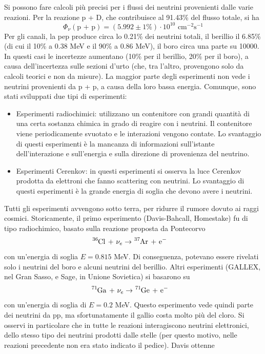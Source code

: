 \documentclass[a4paper,11pt]{article}
\theoremstyle{theorem}
\theoremstyle{definition}
\begin{document}
\begin{itemize}
		\noindent Si possono fare calcoli più precisi per i flussi dei neutrini provenienti dalle varie reazioni. Per la reazione p + D, che contribuisce al 91.43\% del flusso totale, si ha
		\[\Phi_\nu(\textrm{p + p})=(5.992\pm 1\%)\cdot10^{10}\textrm{ cm}^{-2}\textrm{s}^{-1}\]
		Per gli canali, la pep produce circa lo 0.21\% dei neutrini totali, il berillio il 6.85\% (di cui il 10\% a 0.38 MeV e il 90\% a 0.86 MeV), il boro circa una parte su 10000. In questi casi le incertezze aumentano (10\% per il berillio, 20\% per il boro), a causa dell'incertezza sulle sezioni d'urto (che, tra l'altro, provengono solo da calcoli teorici e non da misure). La maggior parte degli esperimenti non vede i neutrini provenienti da p + p, a causa della loro bassa energia. Comunque, sono stati sviluppati due tipi di esperimenti:
		\begin{itemize}
			\item Esperimenti radiochimici: utilizzano un contenitore con grandi quantità di una certa sostanza chimica in grado di reagire con i neutrini. Il contenitore viene periodicamente svuotato e le interazioni vengono contate. Lo svantaggio di questi esperimenti è la mancanza di informazioni sull'istante dell'interazione e sull'energia e sulla direzione di provenienza del neutrino.
			\item Esperimenti Cerenkov: in questi esperimenti si osserva la luce Cerenkov prodotta da elettroni che fanno scattering con neutrini. Lo svantaggio di questi esperimenti è la grande energia di soglia che devono avere i neutrini.
		\end{itemize}
		Tutti gli esperimenti avvengono sotto terra, per ridurre il rumore dovuto ai raggi cosmici. Storicamente, il primo esperimento (Davis-Bahcall, Homestake) fu di tipo radiochimico, basato sulla reazione proposta da Pontecorvo
		\begin{align*}
			\tensor[^{36}]{\mathrm{Cl}}{}\textrm{ + }\nu_e&\rightarrow\tensor[^{37}]{\mathrm{Ar}}{}\textrm{ + e}^-
		\end{align*}
		con un'energia di soglia $E=0.815$ MeV. Di conseguenza, potevano essere rivelati solo i neutrini del boro e alcuni neutrini del berillio. Altri esperimenti (GALLEX, nel Gran Sasso, e Sage, in Unione Sovietica) si basarono su
		\begin{align*}
		\tensor[^{71}]{\mathrm{Ga}}{}\textrm{ + }\nu_e&\rightarrow\tensor[^{71}]{\mathrm{Ge}}{}\textrm{ + e}^-
		\end{align*}
		con un'energia di soglia di $E=0.2$ MeV. Questo esperimento vede quindi parte dei neutrini da pp, ma sfortunatamente il gallio costa molto più del cloro. Si osservi in particolare che in tutte le reazioni interagiscono neutrini elettronici, dello stesso tipo dei neutrini prodotti dalle stelle (per questo motivo, nelle reazioni precedente non era stato indicato il pedice). Davis ottenne

\end{itemize}
\end{document}
